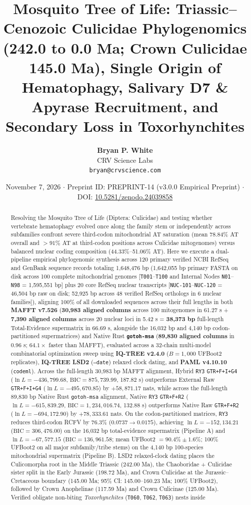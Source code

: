 \documentclass[10pt,letterpaper]{article}
\title{\textbf{Mosquito Tree of Life: Triassic--Cenozoic Culicidae Phylogenomics (242.0 to 0.0 Ma; Crown Culicidae 145.0 Ma), Single Origin of Hematophagy, Salivary D7 \& Apyrase Recruitment, and Secondary Loss in Toxorhynchites}}
\author{\textbf{Bryan P. White} \\ CRV Science Labs \\ \texttt{bryan@crvscience.com}}
\date{November 7, 2026 \quad $\cdot$ \quad Preprint ID: PREPRINT-14 (v3.0.0 Empirical Preprint) \quad $\cdot$ \quad DOI: \href{https://doi.org/10.5281/zenodo.24039858}{10.5281/zenodo.24039858}}
\begin{document}
\maketitle

\begin{abstract}
\noindent Resolving the Mosquito Tree of Life (Diptera: Culicidae) and testing whether vertebrate hematophagy evolved once along the family stem or independently across subfamilies confront severe third-codon mitochondrial AT saturation (mean 78.84\% AT overall and $>91\%$ AT at third-codon positions across Culicidae mitogenomes) versus balanced nuclear coding composition (44.33\%--51.06\% AT). Here we execute a dual-pipeline empirical phylogenomic synthesis across 120 primary verified NCBI RefSeq and GenBank sequence records totaling 1,648,476 bp (1,642,055 bp primary FASTA on disk across 100 complete mitochondrial genomes [\texttt{T001}--\texttt{T100} and Internal Nodes \texttt{N01}--\texttt{N98} = 1,595,551 bp] plus 20 core RefSeq nuclear transcripts [\texttt{NUC-101}--\texttt{NUC-120} = 46,504 bp raw on disk; 52,925 bp across 48 verified RefSeq orthologs in 6 nuclear families]), aligning 100\% of all downloaded sequences across their full lengths in both \textbf{MAFFT v7.526} (\textbf{30,983 aligned columns} across 100 mitogenomes in 61.27 s + \textbf{7,390 aligned columns} across 20 nuclear loci in 5.42 s = \textbf{38,373 bp} full-length Total-Evidence supermatrix in 66.69 s, alongside the 16,032 bp and 4,140 bp codon-partitioned supermatrices) and Native Rust \textbf{\texttt{gotoh-msa}} (\textbf{89,830 aligned columns} in 0.96 s; $64.1\times$ faster than MAFFT), evaluated across a 32-chain multi-model combinatorial optimization sweep using \textbf{IQ-TREE v2.4.0} ($B = 1,000$ UFBoot2 replicates), \textbf{IQ-TREE LSD2} (\texttt{--date}) relaxed clock dating, and \textbf{PAML v4.10.10} (\texttt{codeml}). Across the full-length 30,983 bp MAFFT alignment, Hybrid \texttt{RY3} \texttt{GTR+F+I+G4} ($\ln L = -436,799.68$, $\text{BIC} = 875,739.99$, 187.82 s) outperforms External Raw \texttt{GTR+F+I+G4} ($\ln L = -495,670.85$) by $+58,871.17$ nats, while across the full-length 89,830 bp Native Rust \texttt{gotoh-msa} alignment, Native \texttt{RY3} \texttt{GTR+F+R2} ($\ln L = -615,839.29$, $\text{BIC} = 1,234,016.74$, 132.88 s) outperforms Native Raw \texttt{GTR+F+R2} ($\ln L = -694,172.90$) by $+78,333.61$ nats. On the codon-partitioned matrices, \texttt{RY3} reduces third-codon RCFV by 76.3\% ($0.0737 \rightarrow 0.0175$), achieving $\ln L = -152,134.21$ ($\text{BIC} = 306,476.00$) on the 16,032 bp total-evidence supermatrix (Pipeline A) and $\ln L = -67,577.15$ ($\text{BIC} = 136,961.58$; mean UFBoot2 $= 90.4\% \pm 1.6\%$; 100\% UFBoot2 on all major subfamily/tribe stems) on the 4,140 bp 100-species mitochondrial supermatrix (Pipeline B). LSD2 relaxed-clock dating places the Culicomorpha root in the Middle Triassic (242.00 Ma), the Chaoboridae + Culicidae sister split in the Early Jurassic (198.72 Ma), and Crown Culicidae at the Jurassic--Cretaceous boundary (145.00 Ma; 95\% CI: 145.00--160.23 Ma; 100\% UFBoot2), followed by Crown Anophelinae (117.59 Ma) and Crown Culicinae (125.00 Ma). Verified obligate non-biting \textit{Toxorhynchites} (\texttt{T060}, \texttt{T062}, \texttt{T063}) nests inside 
\end{abstract}
\end{document}
